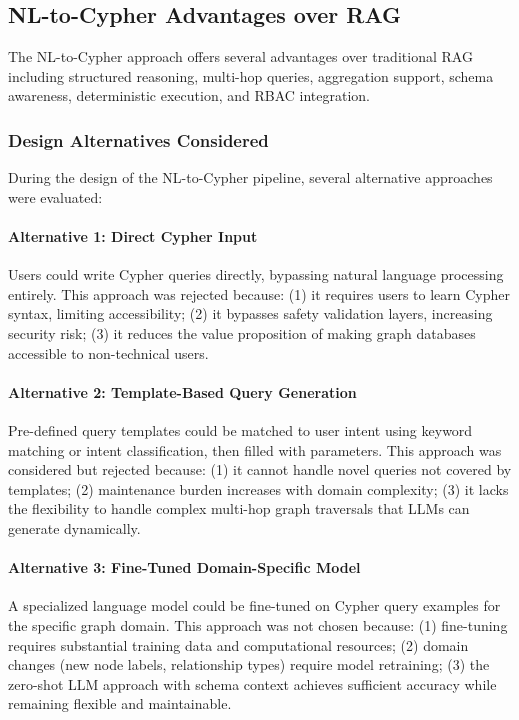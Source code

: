\documentclass[a4paper,twoside]{sapthesis}
\begin{document}
\subsection{NL-to-Cypher Advantages over RAG}
\label{subsec:nl-cypher-advantages}

The NL-to-Cypher approach offers several advantages over traditional RAG including structured reasoning, multi-hop queries, aggregation support, schema awareness, deterministic execution, and RBAC integration.

\subsubsection{Design Alternatives Considered}

During the design of the NL-to-Cypher pipeline, several alternative approaches were evaluated:

\paragraph{Alternative 1: Direct Cypher Input}
Users could write Cypher queries directly, bypassing natural language processing entirely. This approach was rejected because: (1) it requires users to learn Cypher syntax, limiting accessibility; (2) it bypasses safety validation layers, increasing security risk; (3) it reduces the value proposition of making graph databases accessible to non-technical users.

\paragraph{Alternative 2: Template-Based Query Generation}
Pre-defined query templates could be matched to user intent using keyword matching or intent classification, then filled with parameters. This approach was considered but rejected because: (1) it cannot handle novel queries not covered by templates; (2) maintenance burden increases with domain complexity; (3) it lacks the flexibility to handle complex multi-hop graph traversals that LLMs can generate dynamically.

\paragraph{Alternative 3: Fine-Tuned Domain-Specific Model}
A specialized language model could be fine-tuned on Cypher query examples for the specific graph domain. This approach was not chosen because: (1) fine-tuning requires substantial training data and computational resources; (2) domain changes (new node labels, relationship types) require model retraining; (3) the zero-shot LLM approach with schema context achieves sufficient accuracy while remaining flexible and maintainable.
\end{document}
